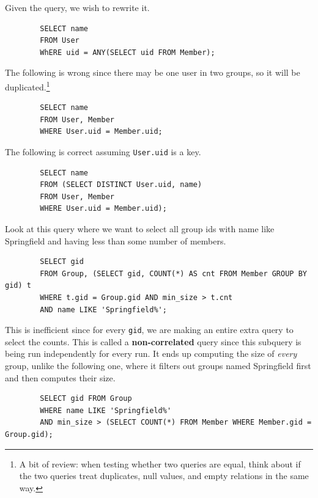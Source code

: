     \begin{example}
      \label{ex:query-rewrite}
      Given the query, we wish to rewrite it. 
      \begin{lstlisting}
        SELECT name 
        FROM User 
        WhERE uid = ANY(SELECT uid FROM Member);
      \end{lstlisting}

      The following is wrong since there may be one user in two groups, so it will be duplicated.\footnote{A bit of review: when testing whether two queries are equal, think about if the two queries treat duplicates, null values, and empty relations in the same way. } 
      \begin{lstlisting}
        SELECT name 
        FROM User, Member 
        WHERE User.uid = Member.uid;
      \end{lstlisting} 

      The following is correct assuming \texttt{User.uid} is a key. 
      \begin{lstlisting}
        SELECT name 
        FROM (SELECT DISTINCT User.uid, name) 
        FROM User, Member 
        WHERE User.uid = Member.uid); 
      \end{lstlisting}
    \end{example}

    \begin{example}
      \label{ex:correlated-subqueries}
      Look at this query where we want to select all group ids with name like Springfield and having less than some number of members. 
      \begin{lstlisting}
        SELECT gid 
        FROM Group, (SELECT gid, COUNT(*) AS cnt FROM Member GROUP BY gid) t 
        WHERE t.gid = Group.gid AND min_size > t.cnt 
        AND name LIKE 'Springfield%';
      \end{lstlisting}
      This is inefficient since for every \texttt{gid}, we are making an entire extra query to select the counts. This is called a \textbf{non-correlated} query since this subquery is being run independently for every run. It ends up computing the size of \textit{every} group, unlike the following one, where it filters out groups named Springfield first and then computes their size. 
      \begin{lstlisting}
        SELECT gid FROM Group 
        WHERE name LIKE 'Springfield%' 
        AND min_size > (SELECT COUNT(*) FROM Member WHERE Member.gid = Group.gid);
      \end{lstlisting}
    \end{example}

